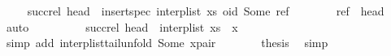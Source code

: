 \begin{isabellebody}
\ \isamarkupfalse%
\ {\isachardoublequoteopen}{\isachardot}{\isachardot}{\isachardot}\ {\isacharequal}\ succ{\isacharunderscore}rel\ {\isacharparenleft}head\ {\isacharhash}\ {\isacharparenleft}insert{\isacharunderscore}spec\ {\isacharparenleft}interp{\isacharunderscore}list\ xs{\isacharparenright}\ {\isacharparenleft}oid{\isacharcomma}\ Some\ ref{\isacharparenright}{\isacharparenright}{\isacharparenright}{\isachardoublequoteclose}\isanewline
\ \ \ \ \ \ \isamarkupfalse%
\ {\isacartoucheopen}ref\ {\isasymnoteq}\ head{\isacartoucheclose}\ \isamarkupfalse%
\ auto\isanewline
\ \ \ \ \isamarkupfalse%
\ \isamarkupfalse%
\ {\isachardoublequoteopen}{\isachardot}{\isachardot}{\isachardot}\ {\isacharequal}\ succ{\isacharunderscore}rel\ {\isacharparenleft}head\ {\isacharhash}\ {\isacharparenleft}interp{\isacharunderscore}list\ {\isacharparenleft}xs\ {\isacharat}\ {\isacharbrackleft}x{\isacharbrackright}{\isacharparenright}{\isacharparenright}{\isacharparenright}{\isachardoublequoteclose}\isanewline
\ \ \ \ \ \ \isamarkupfalse%
\ {\isacharparenleft}simp\ add{\isacharcolon}\ interp{\isacharunderscore}list{\isacharunderscore}tail{\isacharunderscore}unfold\ Some\ x{\isacharunderscore}pair{\isacharparenright}\isanewline
\ \ \ \ \isamarkupfalse%
\ \isamarkupfalse%
\ {\isacharquery}thesis\ \isamarkupfalse%
\ simp\isanewline
\ \ \isamarkupfalse%
\isanewline
{}\isamarkupfalse%
%
\endisatagproof
{\isafoldproof}%
%
\isadelimproof
\isanewline
%
\endisadelimproof
%
\isadelimtheory
\isanewline
%
\endisadelimtheory
%
\isatagtheory
{}\isamarkupfalse%
%
\endisatagtheory
{\isafoldtheory}%
%
\isadelimtheory
%
\endisadelimtheory
%
\end{isabellebody}%
